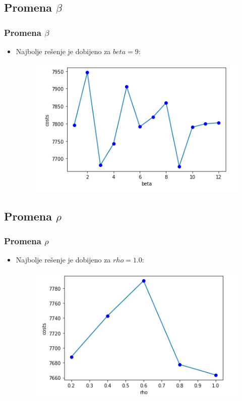 \documentclass[11pt]{beamer}
\begin{document}
\subsection{Promena $\beta$}
\begin{frame}{}
\frametitle{Promena $\beta$}
\begin{itemize}
  \item Najbolje rešenje je dobijeno za $beta = 9$:
	 \begin{figure}[h!]
		\begin{center}
			\includegraphics[scale=0.3]{beta.png}
		\end{center}
		\label{fig:optres}
	\end{figure}

\end{itemize}
\end{frame}

\subsection{Promena $\rho$}
\begin{frame}{}
\frametitle{Promena $\rho$}
\begin{itemize}
  \item Najbolje rešenje je dobijeno za $rho = 1.0$:
	 \begin{figure}[h!]
		\begin{center}
			\includegraphics[scale=0.3]{rho.png}
		\end{center}
		\label{fig:optres}
	\end{figure}

\end{itemize}
\end{frame}
\end{document}
